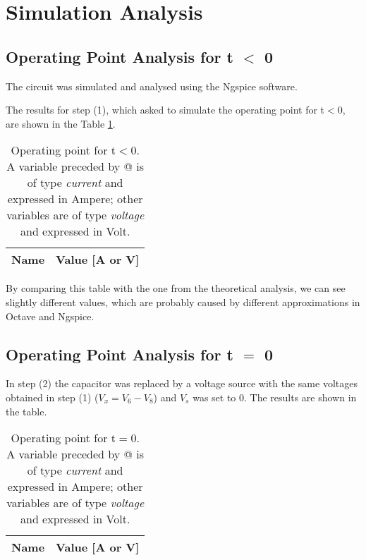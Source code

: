 \newpage
{}
\section{Simulation Analysis}
\label{sec:simulation}

\subsection{Operating Point Analysis for t $<$ 0}

The circuit was simulated and analysed using the Ngspice software. 

The results for step (1), which asked to simulate the operating point for t$<$0, are shown in the Table \ref{tab:op_sim1}.

\begin{table}[H]
  \centering
  \begin{tabular}{|l|r|}
    \hline    
    {\bf Name} & {\bf Value [A or V]} \\ \hline
    
  \end{tabular}
  \caption{Operating point for t$<$0. A variable preceded by @ is of type {\em current}
    and expressed in Ampere; other variables are of type {\it voltage} and expressed in
    Volt.}
  \label{tab:op_sim1}
\end{table}

By comparing this table with the one from the theoretical analysis, we can see slightly different values, which are probably caused by different approximations in Octave and Ngspice.

\subsection{Operating Point Analysis for t $=$ 0}

In step (2) the capacitor was replaced by a voltage source with the same voltages obtained in step (1) ($V_x = V_6 - V_8$) and $V_s$ was set to 0. The results are shown in the table.

\begin{table}[H]
  \centering
  \begin{tabular}{|l|r|}
    \hline    
    {\bf Name} & {\bf Value [A or V]} \\ \hline
    
  \end{tabular}
  \caption{Operating point for t$=$0. A variable preceded by @ is of type {\em current}
    and expressed in Ampere; other variables are of type {\it voltage} and expressed in
    Volt.}
  \label{tab:op_sim2}
\end{table}

